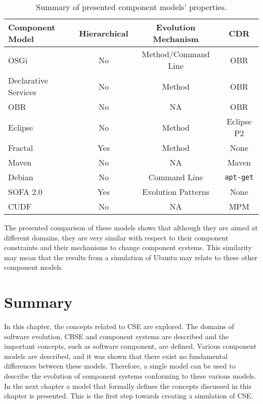 \begin{table}
\begin{tabular}{|l || c | c | c | }
\hline \textbf{Component Model}& \textbf{Hierarchical}& \textbf{Evolution Mechanism}	& \textbf{CDR}\\\hline

OSGi					& No			& Method/Command Line 					& OBR\\
Declarative Services	& No			& Method 								& OBR\\
OBR						& No			& NA									& OBR \\
Eclipse					& No			& Method								& Eclipse P2\\
Fractal					& Yes			& Method 								& None\\
Maven					& No			& NA 									& Maven\\
Debian					& No			& Command Line 							& \texttt{apt-get}\\
SOFA 2.0				& Yes			& Evolution Patterns 					& None\\
CUDF					& No			& NA 									& MPM\\\hline
\end{tabular}
\caption{Summary of presented component models' properties.}
\label{background.comparisonprop}
\end{table}

The presented comparison of these models shows that although they are aimed at different domains, 
they are very similar with respect to their component constraints and their mechanisms to change component systems.
This similarity may mean that the results from a simulation of Ubuntu may relate to these other component models. 

\section{Summary}
In this chapter, the concepts related to CSE are explored.
The domains of software evolution, CBSE and component systems are described and the important concepts, such as software component, are defined.
Various component models are described, and it was shown that there exist no fundamental differences between these models.
Therefore, a single model can be used to describe the evolution of component systems conforming to these various models. 
In the next chapter a model that formally defines the concepts discussed in this chapter is presented. 
This is the first step towards creating a simulation of CSE.

